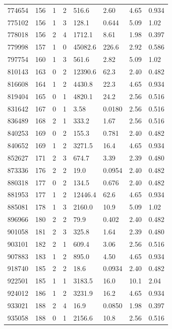 \documentclass[preview]{standalone}
\begin{document}
{{{{\begin{tabular}{L{1.2cm}C{1.2cm} C{0.3cm}C{0.5cm} C{1.4cm}C{1.4cm} C{1.4cm}C{1.4cm}}
  774654  &   156  & 1     &  2 &  516.6  & 2.60  & 4.65 &  0.934   \\ 
  775102  &   156  & 1     &  3 &  128.1  & 0.644  & 5.09 &  1.02   \\ 
  778018  &   156  & 2     &  4 &  1712.1  & 8.61  & 1.98 &  0.397   \\ 
  779998  &   157  & 1     &  0 &  45082.6  & 226.6  & 2.92 &  0.586   \\ 
  797754  &   160  & 1     &  3 &  561.6  & 2.82  & 5.09 &  1.02   \\ 
  810143  &   163  & 0     &  2 &  12390.6  & 62.3  & 2.40 &  0.482   \\ 
  816608  &   164  & 1     &  2 &  4430.8  & 22.3  & 4.65 &  0.934   \\ 
  819404  &   165  & 0     &  1 &  4820.1  & 24.2  & 2.56 &  0.516   \\ 
  831642  &   167  & 0     &  1 &  3.58  & 0.0180  & 2.56 &  0.516   \\ 
  836489  &   168  & 2     &  1 &  333.2  & 1.67  & 2.56 &  0.516   \\ 
  840253  &   169  & 0     &  2 &  155.3  & 0.781  & 2.40 &  0.482   \\ 
  840652  &   169  & 1     &  2 &  3271.5  & 16.4  & 4.65 &  0.934   \\ 
  852627  &   171  & 2     &  3 &  674.7  & 3.39  & 2.39 &  0.480   \\ 
  873336  &   176  & 2     &  2 &  19.0  & 0.0954  & 2.40 &  0.482   \\ 
  880318  &   177  & 0     &  2 &  134.5  & 0.676  & 2.40 &  0.482   \\ 
  881953  &   177  & 1     &  2 &  12446.4  & 62.6  & 4.65 &  0.934   \\ 
  885081  &   178  & 1     &  3 &  2160.0  & 10.9  & 5.09 &  1.02   \\ 
  896966  &   180  & 2     &  2 &  79.9  & 0.402  & 2.40 &  0.482   \\ 
  901058  &   181  & 2     &  3 &  325.8  & 1.64  & 2.39 &  0.480   \\ 
  903101  &   182  & 2     &  1 &  609.4  & 3.06  & 2.56 &  0.516   \\ 
  907883  &   183  & 1     &  2 &  895.0  & 4.50  & 4.65 &  0.934   \\ 
  918740  &   185  & 2     &  2 &  18.6  & 0.0934  & 2.40 &  0.482   \\ 
  922501  &   185  & 1     &  1 &  3183.5  & 16.0  & 10.1 &  2.04   \\ 
  924012  &   186  & 1     &  2 &  3231.9  & 16.2  & 4.65 &  0.934   \\ 
  933021  &   188  & 2     &  4 &  16.9  & 0.0850  & 1.98 &  0.397   \\ 
  935058  &   188  & 0     &  1 &  2156.6  & 10.8  & 2.56 &  0.516   \\ 
\hline 
\end{tabular} 

}}}}
\end{document}
